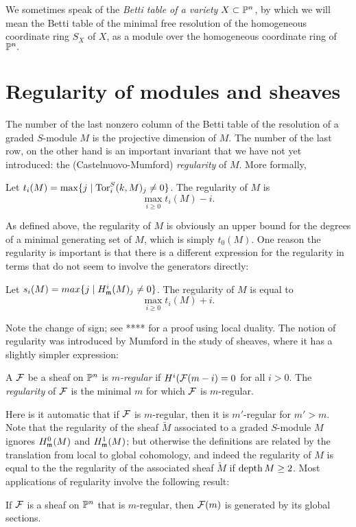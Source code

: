 \noindent We sometimes speak of the \emph{Betti table of a variety $X\subset {\mathbb P}^{n}$}, by which we will mean the Betti table of the minimal free resolution
of the homogeneous coordinate ring $S_{X}$ of $X$, as a module over the homogeneous coordinate ring of ${\mathbb P}^{n}.$ 


\section{Regularity of modules and sheaves}
The number of the last nonzero column of the Betti table of the resolution of a graded $S$-module $M$ is the projective dimension of $M$. The number of the last row, on the other hand is an important invariant that we have not
yet introduced: the (Castelnuovo-Mumford) \emph {regularity} of $M$. More formally,
\begin{definition}
Let $t_{i}(M) = \max \{j \mid \operatorname{Tor}^{S}_{i}(k,M)_{j} \neq 0\}$. The regularity of $M$ is
$$
\max_{i \geq 0} t_{i}(M)-i.
$$
\end{definition}

As defined above, the regularity of $M$ is obviously an upper bound for the degrees of a minimal generating
set of $M$, which is simply $t_{0}(M)$. One reason the regularity is important is that there is a different expression for the regularity in terms that do not seem to involve the generators directly:

\begin{theorem}
 Let $s_{i}(M) = max\{j \mid H^{i}_{\mathfrak m}(M)_{j} \neq 0\}$. The regularity of $M$ is equal to
 $$
\max_{i \geq 0} t_{i}(M)+i.
$$
\end{theorem}

Note the change of sign; see **** for a proof using local duality. The notion of regularity was introduced by Mumford in the study of sheaves, where it has a slightly simpler expression:

\begin{definition}
A ${\mathcal F}$ be a sheaf on ${\mathbb P}^{n}$ is \emph{$m$-regular} if $H^{i}({\mathcal F}(m-i) = 0$ for all $i>0$. The \emph{regularity} of ${\mathcal F}$ is the minimal $m$ for which ${\mathcal F}$ is $m$-regular.
\end{definition}

Here is it automatic that if ${\mathcal F}$ is $m$-regular, then it is $m'$-regular for $m'>m$. Note that the regularity
of the sheaf $\tilde M$ associated to a graded $S$-module $M$ ignores $H^{0}_{\mathfrak m}(M)$ and 
$H^{1}_{\mathfrak m}(M)$; but otherwise the definitions are related by the translation from local to global
cohomology, and indeed the regularity of
$M$ is equal to the the regularity of the associated sheaf $\tilde M$ if $\operatorname{depth} M \geq 2$. Most applications of
regularity involve the following result:
\begin{theorem}
 If ${\mathcal F}$ is a sheaf on ${\mathbb P}^{n}$ that is $m$-regular, then ${\mathcal F}(m)$ is generated by its global sections.
\end{theorem}

